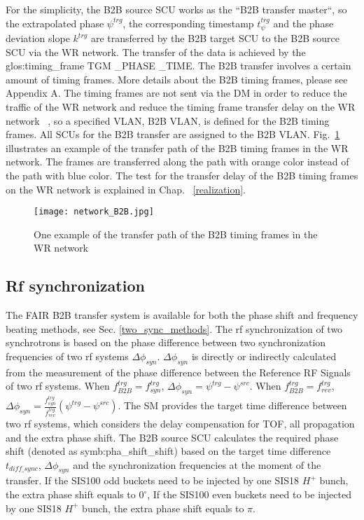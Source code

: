 For the simplicity, the B2B source SCU works as the ``B2B transfer master``, so the extrapolated phase $\psi^\mathit{trg}$, the corresponding timestamp $t_\psi^\mathit{trg}$ and the phase deviation slope $k^\mathit{trg}$ are transferred by the B2B target SCU to the B2B source SCU via the WR network. The transfer of the data is achieved by the \gls{glos:timing_frame} TGM \_PHASE \_TIME. The B2B transfer involves a certain amount of timing frames. More details about the B2B timing frames, please see Appendix A. The timing frames are not sent via the DM in order to reduce the traffic of the WR network and reduce the timing frame transfer delay on the WR network ~\cite{bai_concept_2016}, so a specified VLAN, B2B \gls{VLAN}, is defined for the B2B timing frames. All SCUs for the B2B transfer are assigned to the B2B VLAN. Fig.~\ref{network_B2B} illustrates an example of the transfer path of the B2B timing frames in the WR network. The frames are transferred along the path with orange color instead of the path with blue color. The test for the transfer delay of the B2B timing frames on the WR network is explained in Chap. ~\ref{realization}.
 \begin{figure}[!htb]
   \centering   
   \texttt{[image: network\_B2B.jpg]}
   \caption{One example of the transfer path of the B2B timing frames in the WR network}
   \label{network_B2B}
\end{figure}
\subsection{Rf synchronization}
The FAIR B2B transfer system is available for both the phase shift and frequency beating methods, see Sec. \ref{two_sync_methods}. The rf synchronization of two synchrotrons is based on the phase difference between two synchronization frequencies of two rf systems $\Delta \phi_\mathit{syn}$. $\Delta \phi_\mathit{syn}$ is directly or indirectly calculated from the measurement of the phase difference between the Reference RF Signals of two rf systems. When $f_{\mathit{B2B}}^{trg}=f_{\mathit{syn}}^{trg}$, $\Delta \phi_\mathit{syn}=\psi^\mathit{trg}-\psi^\mathit{src}$. When $f_{\mathit{B2B}}^{trg}=f_{\mathit{rev}}^{trg}$, $\Delta \phi_\mathit{syn}=\frac{f_{\mathit{syn}}^{trg}}{f_{\mathit{rev}}^{trg}}(\psi^\mathit{trg}-\psi^\mathit{src})$. The SM provides the target time difference between two rf systems, which considers the delay compensation for TOF, all propagation and the extra phase shift. The B2B source SCU calculates the required phase shift (denoted as \gls{symb:pha_shift_shift}) based on the target time difference $t_{\mathit{diff\_sync}}$, $\Delta \phi_\mathit{syn}$ and the synchronization frequencies at the moment of the transfer. If the SIS100 odd buckets need to be injected by one SIS18 $H^+$ bunch, the extra phase shift equals to $0^\circ$, If the SIS100 even buckets need to be injected by one SIS18 $H^+$ bunch, the extra phase shift equals to $\pi$. 



